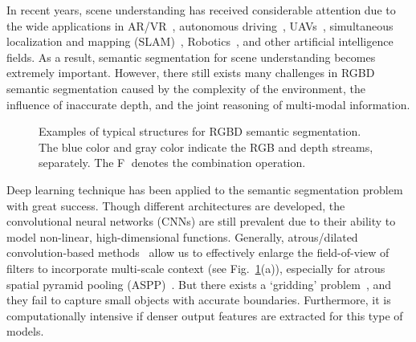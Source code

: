 \documentclass[10pt,twocolumn,letterpaper]{article}
\begin{document}
In recent years, scene understanding has received considerable attention due to the wide applications in AR/VR~\cite{Ping:VR19}, autonomous driving~\cite{Brickwedde:ICCV19,Xu:ICCV19}, UAVs~\cite{Teixeira:RA20}, simultaneous localization and mapping (SLAM)~\cite{Ma:ICRA16}, Robotics~\cite{Marchal:RA20}, and other artificial intelligence fields. As a result, semantic segmentation for scene understanding becomes extremely important. However, there still exists many challenges in RGBD semantic segmentation caused by the complexity of the environment, the influence of inaccurate depth, and the joint reasoning of multi-modal information.

\begin{figure}[!t]
	\centering
		\quad
		
		
	\caption{Examples of typical structures for RGBD semantic segmentation. The blue color and gray color indicate the RGB and depth streams, separately. The \textcircled{F} denotes the combination operation. }
	\label{fig:intro}
\end{figure}



Deep learning technique has been applied to the semantic segmentation problem with great success. Though different architectures are developed, the convolutional neural networks (CNNs) are still prevalent due to their ability to model non-linear, high-dimensional functions.  Generally, atrous/dilated convolution-based methods~\cite{Chen:ICL15,Gadde:ECCV16,Lin:ICCV17,Lin:TPAMI20} allow us to effectively enlarge the field-of-view of filters to incorporate multi-scale context (see Fig.~\ref{fig:intro}(a)), especially for atrous spatial pyramid pooling (ASPP)~\cite{Chen:TPAMI18}. But there exists a `gridding' problem~\cite{Wang:WACV18}, and they fail to capture small objects with accurate boundaries. Furthermore, it is computationally intensive if denser output features are extracted for this type of models.
\end{document}
